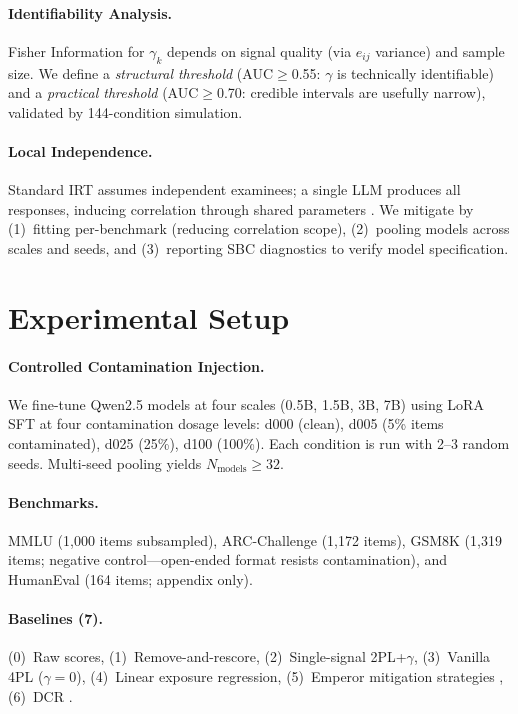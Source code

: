 \documentclass[11pt,a4paper]{article}
\begin{document}
\paragraph{Identifiability Analysis.}
Fisher Information for $\gamma_k$ depends on signal quality (via $e_{ij}$ variance) and sample size.
We define a \emph{structural threshold} (AUC$\geq$0.55: $\gamma$ is technically identifiable) and a \emph{practical threshold} (AUC$\geq$0.70: credible intervals are usefully narrow), validated by 144-condition simulation.

\paragraph{Local Independence.}
Standard IRT assumes independent examinees; a single LLM produces all responses, inducing correlation through shared parameters \citep{mislevy1986bayes}.
We mitigate by (1)~fitting per-benchmark (reducing correlation scope), (2)~pooling models across scales and seeds, and (3)~reporting SBC diagnostics \citep{talts2020validating} to verify model specification.


\section{Experimental Setup}

\paragraph{Controlled Contamination Injection.}
We fine-tune Qwen2.5 models at four scales (0.5B, 1.5B, 3B, 7B) using LoRA SFT at four contamination dosage levels: d000 (clean), d005 (5\% items contaminated), d025 (25\%), d100 (100\%).
Each condition is run with 2--3 random seeds.
Multi-seed pooling yields $N_{\text{models}} \geq 32$.

\paragraph{Benchmarks.}
MMLU (1,000 items subsampled), ARC-Challenge (1,172 items), GSM8K (1,319 items; negative control---open-ended format resists contamination), and HumanEval (164 items; appendix only).

\paragraph{Baselines (7).}
(0)~Raw scores, (1)~Remove-and-rescore, (2)~Single-signal 2PL+$\gamma$, (3)~Vanilla 4PL ($\gamma{=}0$), (4)~Linear exposure regression, (5)~Emperor mitigation strategies \citep{oren2024proving}, (6)~DCR \citep{yang2025dcr}.
\end{document}

